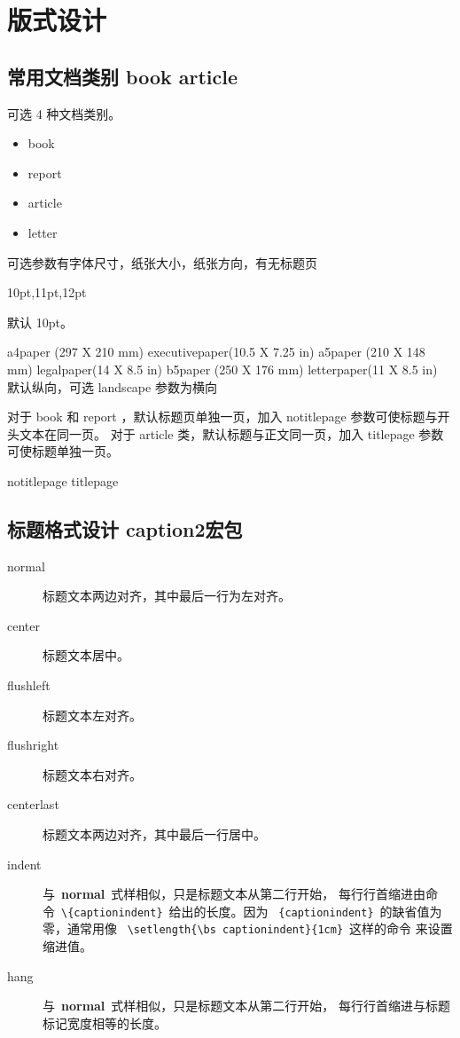 \section{版式设计}
\subsection{常用文档类别 book article}
可选 4 种文档类别。
\begin{itemize}
  \item book
  \item report
  \item article
  \item letter
\end{itemize}
可选参数有字体尺寸，纸张大小，纸张方向，有无标题页
\begin{cmd}[label= 基本字体尺寸]
10pt,11pt,12pt
\end{cmd}
默认 10pt。
\begin{cmd}[label= 纸张大小，方向]
a4paper (297 X 210 mm)   executivepaper(10.5 X 7.25 in)
a5paper (210 X 148 mm)   legalpaper(14 X 8.5 in)
b5paper (250 X 176 mm)   letterpaper(11 X 8.5 in)
默认纵向，可选 landscape 参数为横向
\end{cmd}
对于 book 和 report ，默认标题页单独一页，加入 notitlepage 参数可使标题与开头文本在同一页。
对于 article 类，默认标题与正文同一页，加入 titlepage 参数可使标题单独一页。
\begin{cmd}[label= 标题页选项]
notitlepage     titlepage
\end{cmd}

\subsection{标题格式设计 caption2宏包}

\begin{description}
\item [normal] 标题文本两边对齐，其中最后一行为左对齐。
\item [center] 标题文本居中。
\item [flushleft] 标题文本左对齐。
\item [flushright] 标题文本右对齐。
\item [centerlast] 标题文本两边对齐，其中最后一行居中。
\item [indent] 与~\textbf{normal}~式样相似，只是标题文本从第二行开始，
               每行行首缩进由命令~\verb|\{captionindent}|~给出的长度。因为
               ~\verb|{captionindent}|~的缺省值为零，通常用像~
              \verb|\setlength{\bs captionindent}{1cm}|~这样的命令
              来设置缩进值。
\item [hang] 与~\textbf{normal}~式样相似，只是标题文本从第二行开始，
             每行行首缩进与标题标记宽度相等的长度。
\end{description}

